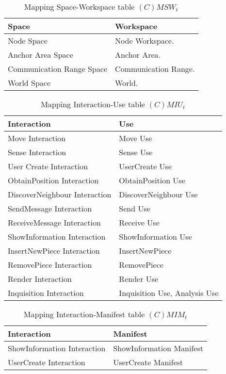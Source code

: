 \begin{table}[H]
	\centering
	\begin{tabular}{|p{4cm}|p{8cm}|}
			\hline
			\textbf{Space} & \textbf{Workspace} \\
			\hline
			Node Space & Node Workspace. \\
			\hline
			Anchor Area Space & Anchor Area. \\
			\hline
			Communication Range Space & Communication Range.\\
			\hline
			World Space & World. \\
			\hline
		\end{tabular}
	\caption{Mapping Space-Workspace table $(C)MSW_t$}
	\label{tab:cmsrt}
\end{table}

\begin{table}[H]
	\centering
	\begin{tabular}{|p{4cm}|p{8cm}|}
			\hline
			\textbf{Interaction} & \textbf{Use} \\
			\hline
			Move Interaction & Move Use \\
			\hline
			Sense Interaction & Sense Use \\
			\hline
			User Create Interaction & UserCreate Use \\
			\hline
			ObtainPosition Interaction & ObtainPosition Use \\	
			\hline
			DiscoverNeighbour Interaction & DiscoverNeighbour Use \\	
			\hline
			SendMessage Interaction & Send Use \\	
			\hline
			ReceiveMessage Interaction & Receive Use \\	
			\hline
			ShowInformation Interaction & ShowInformation Use \\
			\hline
			InsertNewPiece Interaction & InsertNewPiece \\
			\hline
			RemovePiece Interaction & RemovePiece \\
			\hline
			Render Interaction & Render Use \\
			\hline
			Inquisition Interaction & Inquisition Use, Analysis Use \\
			\hline
		\end{tabular}
	\caption{Mapping Interaction-Use table $(C)MIU_t$}
	\label{tab:cmiut}
\end{table}

\begin{table}[H]
	\centering
	\begin{tabular}{|p{4cm}|p{8cm}|}
			\hline
			\textbf{Interaction} & \textbf{Manifest} \\
			\hline
			ShowInformation Interaction & ShowInformation Manifest \\
			\hline
			UserCreate Interaction & UserCreate Manifest \\
			\hline
		\end{tabular}
	\caption{Mapping Interaction-Manifest table $(C)MIM_t$}
	\label{tab:cmimt}
\end{table}

